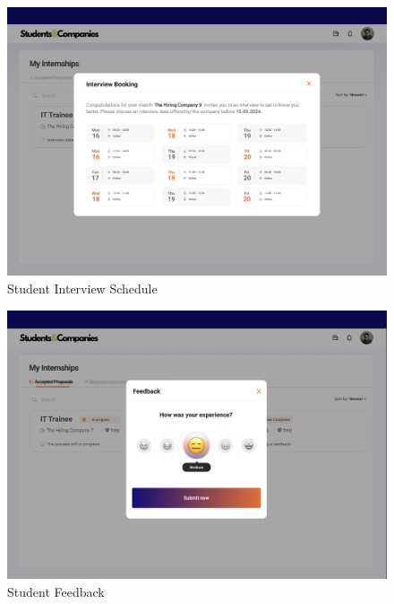 \documentclass[a4paper,12pt]{article}
\begin{document}
\begin{figure}[H]
    \centering
    \includegraphics[scale = 0.42]{figures/UserInterfaces/Student/BookingPop-up.png}
    \caption{Student Interview Schedule}
     \centering
\end{figure}

\begin{figure}[H]
    \centering
    \includegraphics[scale = 0.42]{figures/UserInterfaces/Student/Feedback.png}
    \caption{Student Feedback}
     \centering
\end{figure}
\end{document}
